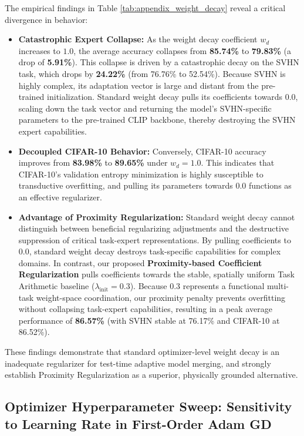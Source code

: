 \documentclass{article}
\theoremstyle{plain}
\theoremstyle{definition}
\theoremstyle{remark}
\begin{document}
The empirical findings in Table \ref{tab:appendix_weight_decay} reveal a critical divergence in behavior:
\begin{itemize}
    \item \textbf{Catastrophic Expert Collapse:} As the weight decay coefficient $w_d$ increases to $1.0$, the average accuracy collapses from \textbf{85.74\%} to \textbf{79.83\%} (a drop of \textbf{5.91\%}). This collapse is driven by a catastrophic decay on the SVHN task, which drops by \textbf{24.22\%} (from 76.76\% to 52.54\%). Because SVHN is highly complex, its adaptation vector is large and distant from the pre-trained initialization. Standard weight decay pulls its coefficients towards 0.0, scaling down the task vector and returning the model's SVHN-specific parameters to the pre-trained CLIP backbone, thereby destroying the SVHN expert capabilities.
    \item \textbf{Decoupled CIFAR-10 Behavior:} Conversely, CIFAR-10 accuracy improves from \textbf{83.98\%} to \textbf{89.65\%} under $w_d = 1.0$. This indicates that CIFAR-10's validation entropy minimization is highly susceptible to transductive overfitting, and pulling its parameters towards 0.0 functions as an effective regularizer.
    \item \textbf{Advantage of Proximity Regularization:} Standard weight decay cannot distinguish between beneficial regularizing adjustments and the destructive suppression of critical task-expert representations. By pulling coefficients to 0.0, standard weight decay destroys task-specific capabilities for complex domains. In contrast, our proposed \textbf{Proximity-based Coefficient Regularization} pulls coefficients towards the stable, spatially uniform Task Arithmetic baseline ($\lambda_{\text{init}} = 0.3$). Because 0.3 represents a functional multi-task weight-space coordination, our proximity penalty prevents overfitting without collapsing task-expert capabilities, resulting in a peak average performance of \textbf{86.57\%} (with SVHN stable at 76.17\% and CIFAR-10 at 86.52\%). 
\end{itemize}
These findings demonstrate that standard optimizer-level weight decay is an inadequate regularizer for test-time adaptive model merging, and strongly establish Proximity Regularization as a superior, physically grounded alternative.

\subsection{Optimizer Hyperparameter Sweep: Sensitivity to Learning Rate in First-Order Adam GD}
\label{sec:appendix_learning_rate}
\end{document}
